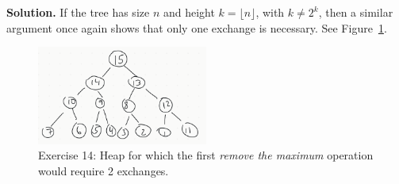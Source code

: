 \documentclass[12pt, a4paper]{article}
\newenvironment{sol}[1][Solution]
{\par\medskip\noindent \textbf{#1.} }
{\medskip}
\begin{document}
\begin{sol}
		If the tree has size $n$ and height $k=\lfloor n\rfloor$, with $k\neq 2^k$,
		then a similar argument once again shows that only one exchange is necessary.
		See Figure~\ref{fig:ex-14-remove-max-once}.
		\begin{figure}
			\centering
			\includegraphics[width=0.5\textwidth]{exercise-14-remove-max-once}
			\caption{Exercise 14: Heap for which the first \emph{remove the maximum} operation
			would require 2 exchanges.}
			\label{fig:ex-14-remove-max-once}
		\end{figure}
		

\end{sol}
\end{document}
